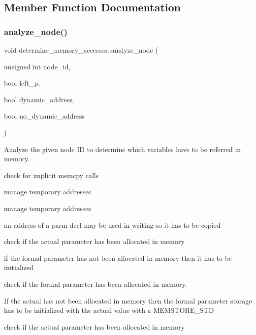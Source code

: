 \subsection{Member Function Documentation}
\mbox{\label{classdetermine__memory__accesses_a28b2c63625b32f4cb63221e0d8a51b96}} 
\subsubsection{\texorpdfstring{analyze\+\_\+node()}{analyze\_node()}}
{\footnotesize\ttfamily void determine\+\_\+memory\+\_\+accesses\+::analyze\+\_\+node (\begin{DoxyParamCaption}\item[{unsigned int}]{node\+\_\+id,  }\item[{bool}]{left\+\_\+p,  }\item[{bool}]{dynamic\+\_\+address,  }\item[{bool}]{no\+\_\+dynamic\+\_\+address }\end{DoxyParamCaption})\hspace{0.3cm}{\ttfamily [private]}}



Analyze the given node ID to determine which variables have to be referred in memory. 

check for implicit memcpy calls

manage temporary addresses

manage temporary addresses

an address of a parm decl may be used in writing so it has to be copied

check if the actual parameter has been allocated in memory

if the formal parameter has not been allocated in memory then it has to be initialized

check if the formal parameter has been allocated in memory.

If the actual has not been allocated in memory then the formal parameter storage has to be initialized with the actual value with a M\+E\+M\+S\+T\+O\+R\+E\+\_\+\+S\+TD

check if the actual parameter has been allocated in memory

